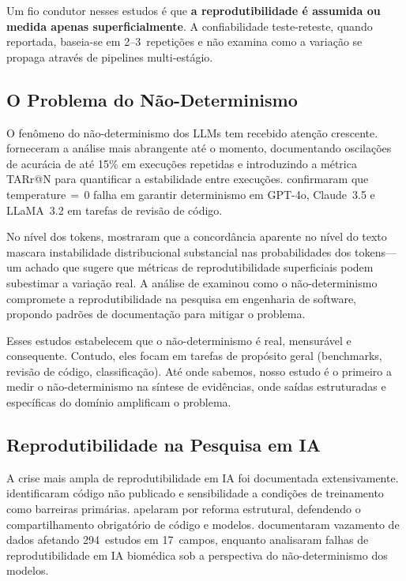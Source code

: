 \documentclass[12pt, a4paper]{article}
\begin{document}
Um fio condutor nesses estudos é que \textbf{a reprodutibilidade é assumida ou medida apenas superficialmente}.
A confiabilidade teste-reteste, quando reportada, baseia-se em 2--3~repetições e não examina como a variação se propaga através de pipelines multi-estágio.

\subsection{O Problema do Não-Determinismo}

O fenômeno do não-determinismo dos LLMs tem recebido atenção crescente.
\citet{atil2024nondeterminism} forneceram a análise mais abrangente até o momento, documentando oscilações de acurácia de até 15\% em execuções repetidas e introduzindo a métrica TARr@N para quantificar a estabilidade entre execuções.
\citet{klishevich2025codereview} confirmaram que temperature$\,{=}\,$0 falha em garantir determinismo em GPT-4o, Claude~3.5 e LLaMA~3.2 em tarefas de revisão de código.

No nível dos tokens, \citet{fu2026beyond} mostraram que a concordância aparente no nível do texto mascara instabilidade distribucional substancial nas probabilidades dos tokens---um achado que sugere que métricas de reprodutibilidade superficiais podem subestimar a variação real.
A análise de \citet{angermeir2025icse} examinou como o não-determinismo compromete a reprodutibilidade na pesquisa em engenharia de software, propondo padrões de documentação para mitigar o problema.

Esses estudos estabelecem que o não-determinismo é real, mensurável e consequente.
Contudo, eles focam em tarefas de propósito geral (benchmarks, revisão de código, classificação).
Até onde sabemos, nosso estudo é o primeiro a medir o não-determinismo na síntese de evidências, onde saídas estruturadas e específicas do domínio amplificam o problema.

\subsection{Reprodutibilidade na Pesquisa em IA}

A crise mais ampla de reprodutibilidade em IA foi documentada extensivamente.
\citet{hutson2018science} identificaram código não publicado e sensibilidade a condições de treinamento como barreiras primárias.
\citet{haibe2020nature} apelaram por reforma estrutural, defendendo o compartilhamento obrigatório de código e modelos.
\citet{kapoor2023leakage} documentaram vazamento de dados afetando 294~estudos em 17~campos, enquanto \citet{han2025biomedical} analisaram falhas de reprodutibilidade em IA biomédica sob a perspectiva do não-determinismo dos modelos.
\end{document}
